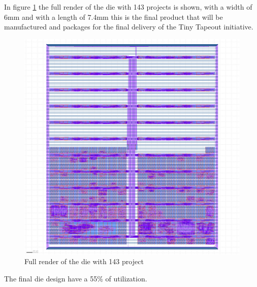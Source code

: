 In figure \ref*{fig:fulldie} the full render of the die with 143 projects is shown, with a width of 6mm and with a length of 7.4mm this is the final product that will be manufactured and packages for the final delivery of the Tiny Tapeout initiative.
\begin{figure}[H]
    \centering
    \includegraphics[width=\linewidth]{Pictures/fullfabricationdie.png}
    \caption{Full render of the die with 143 project}\label{fig:fulldie}
\end{figure}
 
The final die design have a 55\% of utilization.
 